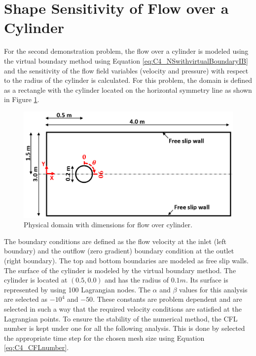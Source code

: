 \section{Shape Sensitivity of Flow over a Cylinder}
For the second demonstration problem, the flow over a cylinder is modeled using the virtual boundary method using Equation \eqref{eq:C4_NSwithvirtualBoundaryIB} and the sensitivity of the flow field variables (velocity and pressure) with respect to the radius of the cylinder is calculated. For this problem, the domain is defined as a rectangle with the cylinder located on the horizontal symmetry line as shown in Figure \ref{fig:C4_cylinderPhysicalDomain}.

\begin{figure}[H]
    \centering
    \includegraphics[width=12.00cm]{Chapter_4/figure/flow_over_cylinder/flow_over_cylinder.png}
    \caption{Physical domain with dimensions for flow over cylinder.}
    \label{fig:C4_cylinderPhysicalDomain}
\end{figure}

The boundary conditions are defined as the flow velocity at the inlet (left boundary) and the outflow (zero gradient) boundary condition at the outlet (right boundary). The top and bottom boundaries are modeled as free slip walls. The surface of the cylinder is modeled by the virtual boundary method. The cylinder is located at $(0.5, 0.0)$ and has the radius of $0.1 m$. Its surface is represented by using 100 Lagrangian nodes. The $\alpha$ and $\beta$ values for this analysis are selected as $-10^4$ and $-50$. These constants are problem dependent and are selected in such a way that the required velocity conditions are satisfied at the Lagrangian points. To ensure the stability of the numerical method, the CFL number is kept under one for all the following analysis. This is done by selected the appropriate time step for the chosen mesh size using Equation \eqref{eq:C4_CFLnumber}.

